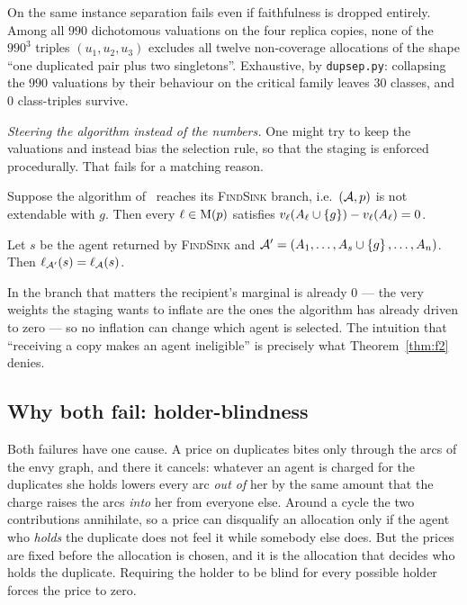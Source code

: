 \begin{theorem}
\label{thm:w4prime}
On the same instance separation fails even if faithfulness is dropped entirely.
Among all $990$ dichotomous valuations on the four replica copies, none of the
$990^3$ triples $(u_1,u_2,u_3)$ excludes all twelve non-coverage allocations of
the shape ``one duplicated pair plus two singletons''. Exhaustive, by
\texttt{dupsep.py}: collapsing the $990$ valuations by their behaviour on the
critical family leaves $30$ classes, and $0$ class-triples survive.
\end{theorem}

\emph{Steering the algorithm instead of the numbers.} One might try to keep the
valuations and instead bias the selection rule, so that the staging is enforced
procedurally. That fails for a matching reason.

\begin{theorem}
\label{thm:f2}
Suppose the algorithm of~\cite{BKNS22} reaches its \textsc{FindSink} branch, i.e.\
$(\mathcal{A},p)$ is not extendable with $g$. Then every $\ell \in
\mathrm{M}(p)$ satisfies $v_\ell(A_{\ell} \cup \left\{g\right\}) -
v_\ell(A_{\ell}) = 0$.
\end{theorem}

\begin{corollary}
\label{cor:f3}
Let $s$ be the agent returned by \textsc{FindSink} and $\mathcal{A}' =
(A_{1},\dots,A_{s} \cup \left\{g\right\},\dots,A_{n})$. Then
$\ell_{\mathcal{A}'}(s) = \ell_{\mathcal{A}}(s)$.
\end{corollary}

In the branch that matters the recipient's marginal is already $0$ --- the very
weights the staging wants to inflate are the ones the algorithm has already
driven to zero --- so no inflation can change which agent is selected. The
intuition that ``receiving a copy makes an agent ineligible'' is precisely what
Theorem~\ref{thm:f2} denies.

\subsection{Why both fail: holder-blindness}
\label{sec:holderblind}

Both failures have one cause. A price on duplicates bites only through the arcs
of the envy graph, and there it cancels: whatever an agent is charged for the
duplicates she holds lowers every arc \emph{out of} her by the same amount that
the charge raises the arcs \emph{into} her from everyone else. Around a cycle the
two contributions annihilate, so a price can disqualify an allocation only if the
agent who \emph{holds} the duplicate does not feel it while somebody else does.
But the prices are fixed before the allocation is chosen, and it is the
allocation that decides who holds the duplicate. Requiring the holder to be blind
for every possible holder forces the price to zero.

